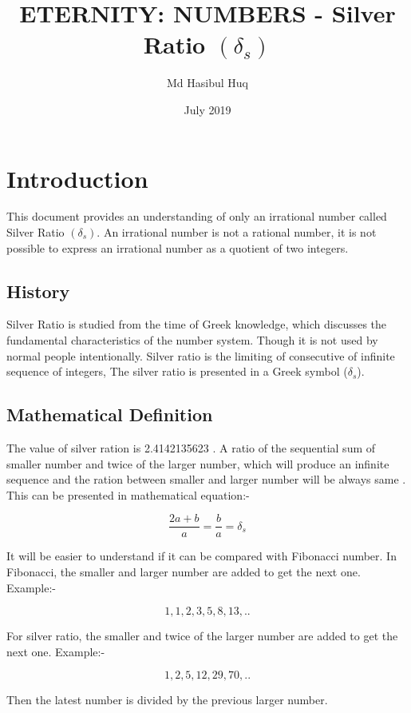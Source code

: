 \documentclass{article}
\title{ETERNITY: NUMBERS - Silver Ratio $(\delta_s)$}
\author{Md Hasibul Huq}
\date{July 2019}
\begin{document}
\maketitle

\section{Introduction}          %

This document provides an understanding of only an irrational  number called Silver Ratio $(\delta_s)$. An irrational  number is  not  a rational  number, it is not possible to express an irrational number as a quotient of two integers.
\subsection{History}
Silver Ratio is studied from the time of Greek knowledge, which discusses the fundamental characteristics of the number system. Though it is not used by normal people intentionally. Silver ratio is the limiting of consecutive  of infinite sequence of integers, The silver ratio is presented in a Greek symbol ($\delta_s$).

\subsection{Mathematical Definition}
The value of silver ration is 2.4142135623 \cite{jdc_silver}. A ratio of the sequential sum of smaller number and twice of the larger number, which will produce an infinite sequence and the ration between smaller and larger number will be always same \cite{numberphile_silver}. This can be presented in mathematical equation:- 

\[ \dfrac{2a + b}{a}  = \dfrac{b}{a} = \delta_s \]

It will be easier to understand if it can be compared with Fibonacci number.
In Fibonacci, the smaller and larger number are added to get the next one. 
Example:-

$$1,1,2,3,5,8,13,..$$

For silver ratio, the smaller and twice of the larger number are added to get the next one. Example:-

\[1,2,5,12,29,70,..\] 

Then the latest number is divided  by the previous larger number. 
\end{document}
